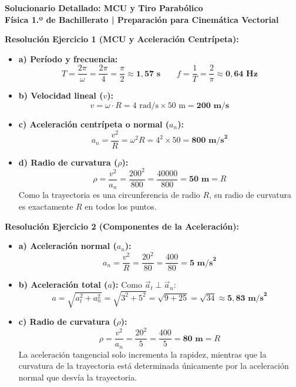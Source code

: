 \documentclass[11pt,a4paper]{article}
\begin{document}
\pagestyle{empty}

\begin{center}
    {\LARGE \textbf{Solucionario Detallado: MCU y Tiro Parabólico}}\\[4pt]
    {\large \textbf{Física 1.º de Bachillerato | Preparación para Cinemática Vectorial}}
\end{center}

\vspace{0.2cm}
\noindent\textbf{Resolución Ejercicio 1 (MCU y Aceleración Centrípeta):}
\begin{itemize}[leftmargin=1.5em, itemsep=3pt]
    \item \textbf{a) Período y frecuencia:}
    \[
    T = \frac{2\pi}{\omega} = \frac{2\pi}{4} = \frac{\pi}{2} \approx \mathbf{1{,}57\text{ s}} \qquad f = \frac{1}{T} = \frac{2}{\pi} \approx \mathbf{0{,}64\text{ Hz}}
    \]
    \item \textbf{b) Velocidad lineal ($v$):}
    \[
    v = \omega \cdot R = 4\text{ rad/s} \times 50\text{ m} = \mathbf{200\text{ m/s}}
    \]
    \item \textbf{c) Aceleración centrípeta o normal ($a_n$):}
    \[
    a_n = \frac{v^2}{R} = \omega^2 R = 4^2 \times 50 = \mathbf{800\text{ m/s}^2}
    \]
    \item \textbf{d) Radio de curvatura ($\rho$):}
    \[
    \rho = \frac{v^2}{a_n} = \frac{200^2}{800} = \frac{40000}{800} = \mathbf{50\text{ m}} = R
    \]
    Como la trayectoria es una circunferencia de radio $R$, su radio de curvatura es exactamente $R$ en todos los puntos.
\end{itemize}

\vspace{0.4cm}
\noindent\textbf{Resolución Ejercicio 2 (Componentes de la Aceleración):}
\begin{itemize}[leftmargin=1.5em, itemsep=3pt]
    \item \textbf{a) Aceleración normal ($a_n$):}
    \[
    a_n = \frac{v^2}{R} = \frac{20^2}{80} = \frac{400}{80} = \mathbf{5\text{ m/s}^2}
    \]
    \item \textbf{b) Aceleración total ($a$):}
    Como $\vec{a}_t \perp \vec{a}_n$:
    \[
    a = \sqrt{a_t^2 + a_n^2} = \sqrt{3^2 + 5^2} = \sqrt{9 + 25} = \sqrt{34} \approx \mathbf{5{,}83\text{ m/s}^2}
    \]
    \item \textbf{c) Radio de curvatura ($\rho$):}
    \[
    \rho = \frac{v^2}{a_n} = \frac{20^2}{5} = \frac{400}{5} = \mathbf{80\text{ m}} = R
    \]
    La aceleración tangencial solo incrementa la rapidez, mientras que la curvatura de la trayectoria está determinada únicamente por la aceleración normal que desvía la trayectoria.
\end{itemize}
\end{document}
